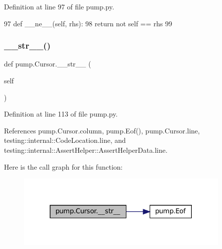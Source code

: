 Definition at line 97 of file pump.\+py.


\begin{DoxyCode}
97   \textcolor{keyword}{def }\_\_ne\_\_(self, rhs):
98     \textcolor{keywordflow}{return} \textcolor{keywordflow}{not} self == rhs
99 
\end{DoxyCode}
\mbox{\label{classpump_1_1Cursor_ada8d922763be27a0b1745e94748de2c3}} 
\subsubsection{\texorpdfstring{\+\_\+\+\_\+str\+\_\+\+\_\+()}{\_\_str\_\_()}}
{\footnotesize\ttfamily def pump.\+Cursor.\+\_\+\+\_\+str\+\_\+\+\_\+ (\begin{DoxyParamCaption}\item[{}]{self }\end{DoxyParamCaption})}



Definition at line 113 of file pump.\+py.



References pump.\+Cursor.\+column, pump.\+Eof(), pump.\+Cursor.\+line, testing\+::internal\+::\+Code\+Location.\+line, and testing\+::internal\+::\+Assert\+Helper\+::\+Assert\+Helper\+Data.\+line.


Here is the call graph for this function\+:
\nopagebreak
\begin{figure}[H]
\begin{center}
\leavevmode
\includegraphics[width=294pt]{classpump_1_1Cursor_ada8d922763be27a0b1745e94748de2c3_cgraph}
\end{center}
\end{figure}
\mbox{\label{classpump_1_1Cursor_a297cc8271af2aade66acb5fa5973a748}} 
